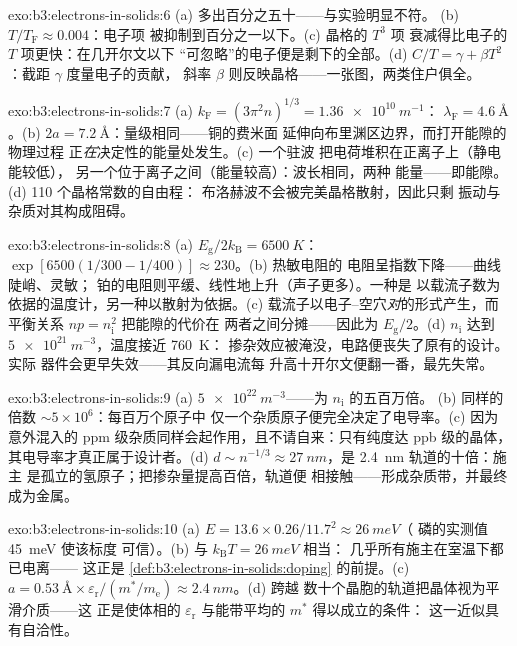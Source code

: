\begin{solution}{exo:b3:electrons-in-solids:6}
(a) 多出百分之五十——与实验明显不符。
(b) $T/T_{\text{F}} \approx 0.004$：电子项
被抑制到百分之一以下。(c) 晶格的 $T^3$ 项
衰减得比电子的 $T$ 项更快：在几开尔文以下
“可忽略”的电子便是剩下的全部。(d) $C/T =
\gamma + \beta T^2$：截距 $\gamma$ 度量电子的贡献，
斜率 $\beta$ 则反映晶格——一张图，两类住户俱全。
\end{solution}

\begin{solution}{exo:b3:electrons-in-solids:7}
(a) $k_{\text{F}} = (3\pi^2n)^{1/3} = \qty{1.36e10}{m^{-1}}$：
$\lambda_{\text{F}} = \qty{4.6}{\angstrom}$。(b) $2a =
\qty{7.2}{\angstrom}$：量级相同——铜的费米面
延伸向布里渊区边界，而打开能隙的物理过程
正\emph{在}决定性的能量处发生。(c) 一个驻波
把电荷堆积在正离子上（静电能较低），
另一个位于离子之间（能量较高）：波长相同，两种
能量——即能隙。(d) 110 个晶格常数的自由程：
布洛赫波不会被完美晶格散射，因此只剩
振动与杂质对其构成阻碍。
\end{solution}

\begin{solution}{exo:b3:electrons-in-solids:8}
(a) $E_{\text{g}}/2k_{\text{B}} = \qty{6500}{K}$：
$\exp[6500(1/300 - 1/400)] \approx 230$。(b) 热敏电阻的
电阻呈指数下降——曲线陡峭、灵敏；
铂的电阻则平缓、线性地上升（声子更多）。一种是
以载流子数为依据的温度计，另一种以散射为依据。(c)
载流子以电子–空穴\emph{对}的形式产生，而
平衡关系 $np = n_{\text{i}}^2$ 把能隙的代价在
两者之间分摊——因此为 $E_{\text{g}}/2$。(d)
$n_{\text{i}}$ 达到 $\qty{5e21}{m^{-3}}$，温度接近 \qty{760}{K}：
掺杂效应被淹没，电路便丧失了原有的设计。实际
器件会更早失效——其反向漏电流每
升高十开尔文便翻一番，最先失常。
\end{solution}

\begin{solution}{exo:b3:electrons-in-solids:9}
(a) $\qty{5e22}{m^{-3}}$——为 $n_{\text{i}}$ 的五百万倍。
(b) 同样的倍数 $\sim5\times10^6$：每百万个原子中
仅一个杂质原子便完全决定了电导率。(c) 因为意外混入的 ppm
级杂质同样会起作用，且不请自来：只有纯度达 ppb 级的晶体，
其电导率才真正属于设计者。(d) $d \sim n^{-1/3}
\approx \qty{27}{nm}$，是 \qty{2.4}{nm} 轨道的十倍：施主
是孤立的氢原子；把掺杂量提高百倍，轨道便
相接触——形成杂质带，并最终成为金属。
\end{solution}

\begin{solution}{exo:b3:electrons-in-solids:10}
(a) $E = 13.6\times0.26/11.7^2 \approx \qty{26}{meV}$（
磷的实测值 \qty{45}{meV} 使该标度
可信）。(b) 与 $k_{\text{B}}T = \qty{26}{meV}$ 相当：
几乎所有施主在室温下都已电离——
这正是 \cref{def:b3:electrons-in-solids:doping} 的前提。(c) $a =
\qty{0.53}{\angstrom}\times\varepsilon_{\text{r}}/(m^*/
m_{\text{e}}) \approx \qty{2.4}{nm}$。(d) 跨越
数十个晶胞的轨道把晶体视为平滑介质——这
正是使体相的
$\varepsilon_{\text{r}}$ 与能带平均的 $m^*$ 得以成立的条件：
这一近似具有自洽性。
\end{solution}

